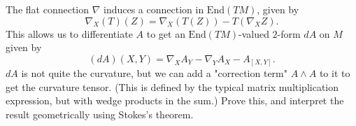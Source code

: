 \documentclass[11pt]{article} %
\begin{document}
\begin{enumerate}
	The flat connection $\nabla$ induces a connection in $\mathrm{End}(TM)$, given by 
	\[
		\nabla_X(T)(Z) = \nabla_X(T(Z)) - T(\nabla_X Z).
	\]
	This allows us to differentiate $A$ to get an $\mathrm{End}(TM)$-valued $2$-form $dA$ on $M$ given by 
	\[
		(dA)(X, Y) = \nabla_X A_Y - \nabla_Y A_X - A_{[X, Y]}.
	\]
	$dA$ is not quite the curvature, but we can add a "correction term" $A \wedge A$ to it to get the curvature tensor. (This is defined by the typical matrix multiplication expression, but with wedge products in the sum.) Prove this, and interpret the result geometrically using Stokes's theorem.


\end{enumerate}
\end{document}
